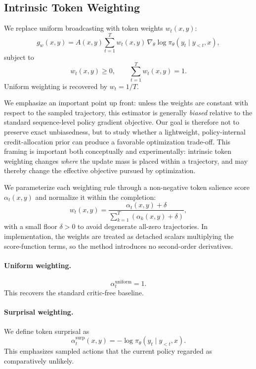 \subsection{Intrinsic Token Weighting}

We replace uniform broadcasting with token weights $w_t(x,y)$:
\begin{equation}
 g_w(x,y) = A(x,y) \sum_{t=1}^{T} w_t(x,y) \, \nabla_\theta \log \pi_\theta(y_t \mid y_{<t}, x),
\end{equation}
subject to
\begin{equation}
 w_t(x,y) \ge 0, \qquad \sum_{t=1}^{T} w_t(x,y) = 1.
\end{equation}
Uniform weighting is recovered by $w_t = 1/T$.

We emphasize an important point up front: unless the weights are constant with respect to the sampled trajectory, this estimator is generally \emph{biased} relative to the standard sequence-level policy gradient objective. Our goal is therefore not to preserve exact unbiasedness, but to study whether a lightweight, policy-internal credit-allocation prior can produce a favorable optimization trade-off. This framing is important both conceptually and experimentally: intrinsic token weighting changes \emph{where} the update mass is placed within a trajectory, and may thereby change the effective objective pursued by optimization.

We parameterize each weighting rule through a non-negative token salience score $\alpha_t(x,y)$ and normalize it within the completion:
\begin{equation}
 w_t(x,y) = \frac{\alpha_t(x,y) + \delta}{\sum_{k=1}^{T}(\alpha_k(x,y) + \delta)},
\end{equation}
with a small floor $\delta > 0$ to avoid degenerate all-zero trajectories. In implementation, the weights are treated as detached scalars multiplying the score-function terms, so the method introduces no second-order derivatives.

\paragraph{Uniform weighting.}
\begin{equation}
 \alpha_t^{\mathrm{uniform}} = 1.
\end{equation}
This recovers the standard critic-free baseline.

\paragraph{Surprisal weighting.}
We define token surprisal as
\begin{equation}
 \alpha_t^{\mathrm{surp}}(x,y) = -\log \pi_\theta(y_t \mid y_{<t}, x).
\end{equation}
This emphasizes sampled actions that the current policy regarded as comparatively unlikely.

